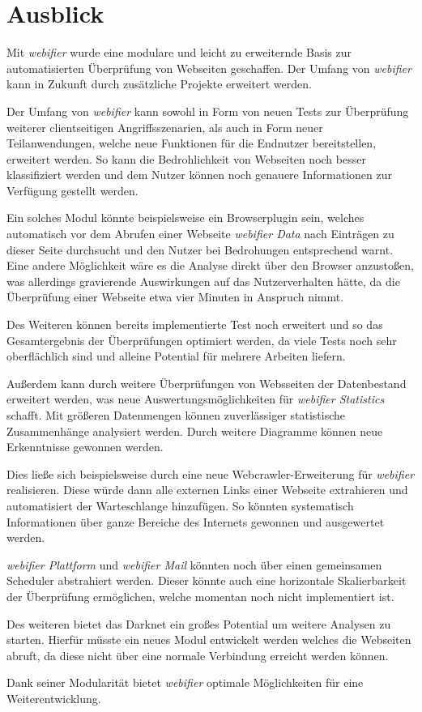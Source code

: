 \chapter{Ausblick}

Mit \textit{webifier} wurde eine modulare und leicht zu erweiternde Basis zur automatisierten Überprüfung
von Webseiten geschaffen. Der Umfang von \textit{webifier} kann in Zukunft durch zusätzliche Projekte
erweitert werden.

Der Umfang von \textit{webifier} kann sowohl in Form von neuen Tests zur Überprüfung weiterer clientseitigen
Angriffsszenarien, als auch in Form neuer Teilanwendungen, welche neue Funktionen für
die Endnutzer bereitstellen, erweitert werden. So kann die Bedrohlichkeit von Webseiten noch besser
klassifiziert werden und dem Nutzer können noch genauere Informationen zur Verfügung gestellt
werden.

Ein solches Modul könnte beispielsweise ein Browserplugin sein, welches automatisch vor dem Abrufen
einer Webseite \textit{webifier Data} nach Einträgen zu dieser Seite durchsucht und den Nutzer bei
Bedrohungen entsprechend warnt. Eine andere Möglichkeit wäre es die Analyse direkt über den Browser
anzustoßen, was allerdings gravierende Auswirkungen auf das Nutzerverhalten hätte, da die
Überprüfung einer Webseite etwa vier Minuten in Anspruch nimmt.

Des Weiteren können bereits implementierte Test noch erweitert und so das Gesamtergebnis der
Überprüfungen optimiert werden, da viele Tests noch sehr oberflächlich sind und alleine Potential
für mehrere Arbeiten liefern.

Außerdem kann durch weitere Überprüfungen von Websseiten der Datenbestand erweitert werden, was neue
Auswertungsmöglichkeiten für \textit{webifier Statistics} schafft. Mit größeren Datenmengen können
zuverlässiger statistische Zusammenhänge analysiert werden. Durch weitere Diagramme können neue
Erkenntnisse gewonnen werden.

Dies ließe sich beispielsweise durch eine neue Webcrawler-Erweiterung für \textit{webifier} realisieren. Diese würde dann alle externen Links einer Webseite extrahieren und automatisiert der Warteschlange hinzufügen. So könnten systematisch Informationen über ganze Bereiche des Internets gewonnen und ausgewertet werden.

\textit{webifier Plattform} und \textit{webifier Mail} könnten noch über einen gemeinsamen Scheduler abstrahiert
werden. Dieser könnte auch eine horizontale Skalierbarkeit der Überprüfung ermöglichen, welche
momentan noch nicht implementiert ist.

Des weiteren bietet das Darknet ein großes Potential um weitere Analysen zu starten. Hierfür
müsste ein neues Modul entwickelt werden welches die Webseiten abruft, da diese nicht über eine
normale Verbindung erreicht werden können.

Dank seiner Modularität bietet \textit{webifier} optimale Möglichkeiten für eine Weiterentwicklung.